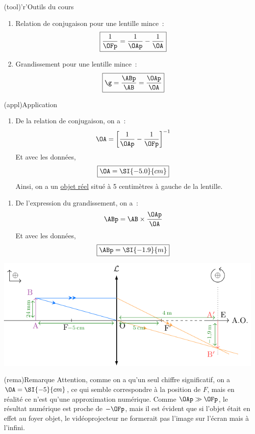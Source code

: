 \documentclass[../../main/main.tex]{subfiles}
\begin{document}
{\begin{tcbraster}[raster columns=2, raster equal height=rows]
\begin{tcb}
\begin{enumerate}
			\end{enumerate}
		\end{tcb}
		\begin{tcb}(tool)'r'{Outils du cours}
			\begin{enumerate}
				\item Relation de conjugaison pour une lentille mince~:
				      \[ \boxed{ \frac{1}{\OFp} = \frac{1}{\OAp} - \frac{1}{\OA}}\]
				\item Grandissement pour une lentille mince~:
				      \[\boxed{\g = \frac{\ABp}{\AB} = \frac{\OAp}{\OA}}\]
			\end{enumerate}
		\end{tcb}
	\end{tcbraster}
	\begin{tcb}(appl){Application}
		\begin{enumerate}
			\item De la relation de conjugaison, on a~:
			      \[\OA = \left[ \frac{1}{\OAp} - \frac{1}{\OFp} \right]^{-1}\]
			      Et avec les données,
			      \[ \boxed{\OA = \SI{- 5.0}{cm}}\]
			      Ainsi, on a un \underline{objet réel} situé à 5 centimètres à gauche de
			      la lentille.
		\end{enumerate}
		\tcblower
		\begin{center}
			\begin{enumerate}[start=2]
				\item De l'expression du grandissement, on a~:
				      \[\ABp = \AB\times\frac{\OAp}{\OA}\]
				      Et avec les données,
				      \[ \boxed{\ABp = \SI{- 1.9}{m}} \]
			\end{enumerate}
			\includegraphics[width=\linewidth]{videoproj}
		\end{center}
	\end{tcb}

	\begin{tcb}(rema){Remarque}
		Attention, comme on a qu'un seul chiffre significatif, on a $\OA =
			\SI{-5}{cm}$, ce qui semble correspondre à la position de $F$, mais en
		réalité ce n'est qu'une approximation numérique. Comme $\OAp \gg \OFp$, le
		résultat numérique est proche de $-\OFp$, mais il est évident que si l'objet
		était en effet au foyer objet, le vidéoprojecteur ne formerait pas l'image
		sur l'écran mais à l'infini.
	\end{tcb}
}
\end{document}
